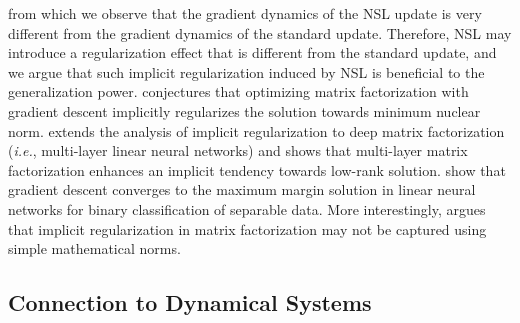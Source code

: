 from which we observe that the gradient dynamics of the NSL update is very different from the gradient dynamics of the standard update. Therefore, NSL may introduce a regularization effect that is different from the standard update, and we argue that such implicit regularization induced by NSL is beneficial to the generalization power. \cite{gunasekar2017implicit} conjectures that optimizing matrix factorization with gradient descent implicitly regularizes the solution towards minimum nuclear norm. \cite{arora2019implicit} extends the analysis of implicit regularization to deep matrix factorization (\emph{i.e.}, multi-layer linear neural networks) and shows that multi-layer matrix factorization enhances an implicit tendency towards low-rank solution. \cite{gunasekar2018implicit,ji2018gradient} show that gradient descent converges to the maximum margin solution in linear neural networks for binary classification of separable data. More interestingly, \cite{arora2019implicit} argues that implicit regularization in matrix factorization may not be captured using simple mathematical norms.

\subsection{Connection to Dynamical Systems}

